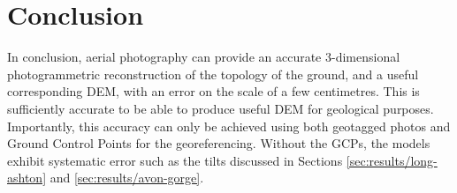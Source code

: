 \section{Conclusion}

In conclusion, aerial photography can provide an accurate 3-dimensional
photogrammetric reconstruction of the topology of the ground, and a useful
corresponding DEM, with an error on the scale of a few centimetres. This is
sufficiently accurate to be able to produce useful DEM for geological purposes.
Importantly, this accuracy can only be achieved using both geotagged photos and
Ground Control Points for the georeferencing. Without the GCPs, the models
exhibit systematic error such as the tilts discussed in Sections
\ref{sec:results/long-ashton} and \ref{sec:results/avon-gorge}.
